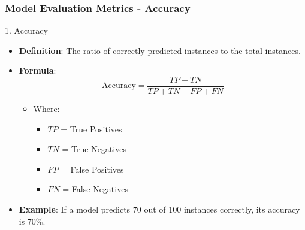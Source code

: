 \documentclass{beamer}
\begin{document}
\begin{frame}[fragile]
    \frametitle{Model Evaluation Metrics - Accuracy}
    \begin{block}{1. Accuracy}
        \begin{itemize}
            \item \textbf{Definition}: The ratio of correctly predicted instances to the total instances.
            \item \textbf{Formula}: 
            \[
            \text{Accuracy} = \frac{TP + TN}{TP + TN + FP + FN}
            \]
            \begin{itemize}
                \item Where:
                \begin{itemize}
                    \item \( TP \) = True Positives
                    \item \( TN \) = True Negatives
                    \item \( FP \) = False Positives
                    \item \( FN \) = False Negatives
                \end{itemize}
            \end{itemize}
            \item \textbf{Example}: If a model predicts 70 out of 100 instances correctly, its accuracy is 70\%.
        \end{itemize}
    \end{block}
\end{frame}
\end{document}
